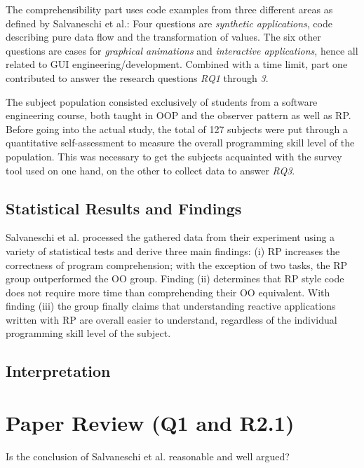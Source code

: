\documentclass[12pt,a4paper]{article}
\begin{document}
The comprehensibility part uses code examples from three different areas as defined by Salvaneschi et al.: Four questions are \emph{synthetic applications}, code describing pure data flow and the transformation of values. The six other questions are cases for \emph{graphical animations} and \emph{interactive applications}, hence all related to GUI engineering/development. Combined with a time limit, part one contributed to answer the research questions \emph{RQ1} through \emph{3}.

The subject population consisted exclusively of students from a software engineering course, both taught in OOP and the observer pattern as well as RP. Before going into the actual study, the total of 127 subjects were put through a quantitative self-assessment to measure the overall programming skill level of the population. This was necessary to get the subjects acquainted with the survey tool used on one hand, on the other to collect data to answer \emph{RQ3}.

\subsection{Statistical Results and Findings}

Salvaneschi et al. processed the gathered data from their experiment using a variety of statistical tests and derive three main findings: (i) RP increases the correctness of program comprehension; with the exception of two tasks, the RP group outperformed the OO group. Finding (ii) determines that RP style code does not require more time than comprehending their OO equivalent. With finding (iii) the group finally claims that understanding reactive applications written with RP are overall easier to understand, regardless of the individual programming skill level of the subject.

\subsection{Interpretation}


\section{Paper Review (Q1 and R2.1)}
Is the conclusion of Salvaneschi et al. \cite{7827078} reasonable and well argued?
\end{document}
